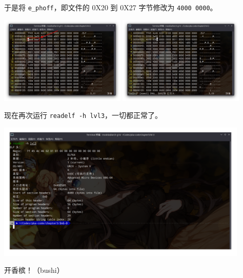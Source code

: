 \documentclass{ctexbeamer}
\begin{document}
    \begin{frame}
    
        于是将 \texttt{e_phoff}，即文件的 0X20 到 0X27 字节修改为 \texttt{4000 0000}。

        \begin{center}
            \includegraphics[width=0.45\textwidth]{pics/lvl3-error3-before.png}\;
            \includegraphics[width=0.45\textwidth]{pics/lvl3-error3-after.png}
        \end{center}

    \end{frame}

    \begin{frame}
    
        现在再次运行 \texttt{readelf -h lvl3}，一切都正常了。

        \begin{center}
            \includegraphics[width=0.9\textwidth]{pics/lvl3-readelf-stage2.png}
        \end{center}

        开香槟！（bushi）
    
    \end{frame}
\end{document}
